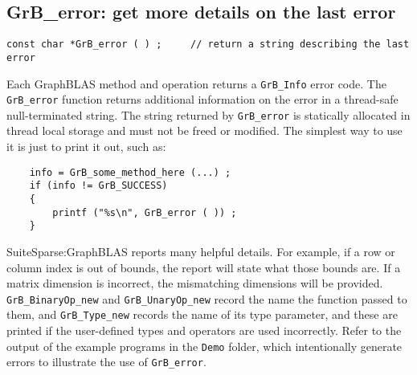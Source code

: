 \documentclass[12pt]{article}
\begin{document}
\newpage
\subsection{{\sf GrB\_error:} get more details on the last error} %
\label{error}

\begin{mdframed}[userdefinedwidth=6in]
{\footnotesize
\begin{verbatim}
const char *GrB_error ( ) ;     // return a string describing the last error
\end{verbatim}
}\end{mdframed}

Each GraphBLAS method and operation returns a \verb'GrB_Info' error code.  The
\verb'GrB_error' function returns additional information on the error in a
thread-safe null-terminated string.  The string returned by \verb'GrB_error' is
statically allocated in thread local storage and must not be freed or modified.
The simplest way to use it is just to print it out, such as:

    {\footnotesize
    \begin{verbatim}
    info = GrB_some_method_here (...) ;
    if (info != GrB_SUCCESS)
    {
        printf ("%s\n", GrB_error ( )) ;
    } \end{verbatim}}

SuiteSparse:GraphBLAS reports many helpful details.  For example, if a row or
column index is out of bounds, the report will state what those bounds are.  If
a matrix dimension is incorrect, the mismatching dimensions will be provided.
\verb'GrB_BinaryOp_new' and \verb'GrB_UnaryOp_new' record the name the function
passed to them, and \verb'GrB_Type_new' records the name of its type parameter,
and these are printed if the user-defined types and operators are used
incorrectly.  Refer to the output of the example programs in the \verb'Demo'
folder, which intentionally generate errors to illustrate the use of
\verb'GrB_error'.


\end{document}

